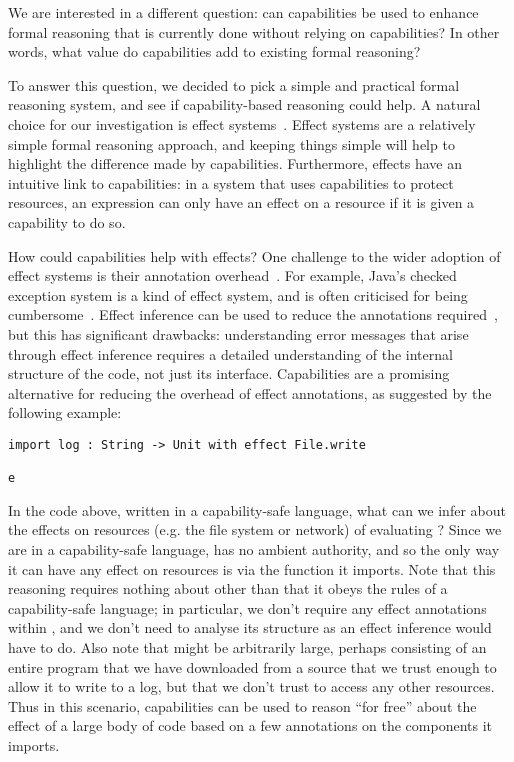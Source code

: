 We are interested in a different question: can capabilities be used to enhance formal reasoning that is currently done without relying on capabilities?
In other words, what value do capabilities add to existing formal reasoning?

To answer this question, we decided to pick a simple and practical formal reasoning system, and see if capability-based reasoning could help.
A natural choice for our investigation is effect systems~\cite{nielson99}.
Effect systems are a relatively simple formal reasoning approach, and keeping things simple will help to highlight the difference made by capabilities.%
Furthermore, effects have an intuitive link to capabilities: in a system that uses capabilities to protect resources, an expression can only have an effect on a resource if it is given a capability to do so.

How could capabilities help with effects?
One challenge to the wider adoption of effect systems is their annotation overhead~\cite{rytz12}.
For example, Java's checked exception system is a kind of effect system, and is often criticised for being cumbersome~\cite{Kiniry2006}.
Effect inference can be used to reduce the annotations required~\cite{koka14}, but this has significant drawbacks: understanding error messages that arise through effect inference requires a detailed understanding of the internal structure of the code, not just its interface.
Capabilities are a promising alternative for reducing the overhead of effect annotations, as suggested by the following example:

\begin{lstlisting}
import log : String -> Unit with effect File.write

e
\end{lstlisting}

In the code above, written in a capability-safe language, what can we infer about the effects on resources (e.g. the file system or network) of evaluating ?
Since we are in a capability-safe language,  has no ambient authority, and so the only way it can have any effect on resources is via the  function it imports.
Note that this reasoning requires nothing about  other than that it obeys the rules of a capability-safe language; in particular, we don't require any effect annotations within , and we don't need to analyse its structure as an effect inference would have to do.
Also note that  might be arbitrarily large, perhaps consisting of an entire program that we have downloaded from a source that we trust enough to allow it to write to a log, but that we don't trust to access any other resources.
Thus in this scenario, capabilities can be used to reason ``for free'' about the effect of a large body of code based on a few annotations on the components it imports.

